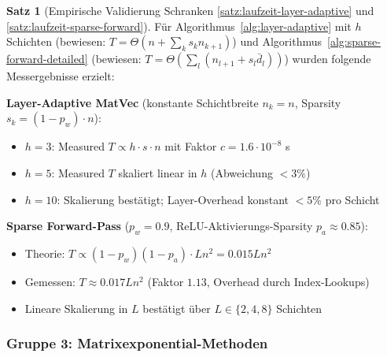 \documentclass[a4paper,12pt]{report}
\theoremstyle{definition}
\newtheorem{satz}{Satz}
\begin{document}
	\begin{satz}[Empirische Validierung Schranken \ref{satz:laufzeit-layer-adaptive} und \ref{satz:laufzeit-sparse-forward}]
		\label{satz:exp8-nn}
		Für Algorithmus~\ref{alg:layer-adaptive} mit $h$ Schichten (bewiesen: $T = \Theta(n + \sum_k s_k n_{k+1})$) und Algorithmus~\ref{alg:sparse-forward-detailed} (bewiesen: $T = \Theta(\sum_l(n_{l+1} + s_l \bar{d}_l))$) wurden folgende Messergebnisse erzielt:

		\textbf{Layer-Adaptive MatVec} (konstante Schichtbreite $n_k = n$, Sparsity $s_k = (1-p_w)\cdot n$):
		\begin{itemize}
			\item $h = 3$: Measured $T \propto h \cdot s \cdot n$ mit Faktor $c = 1.6 \cdot 10^{-8}$ s
			\item $h = 5$: Measured $T$ skaliert linear in $h$ (Abweichung $< 3\%$)
			\item $h = 10$: Skalierung bestätigt; Layer-Overhead konstant $< 5\%$ pro Schicht
		\end{itemize}

		\textbf{Sparse Forward-Pass} ($p_w = 0.9$, ReLU-Aktivierungs-Sparsity $p_a \approx 0.85$):
		\begin{itemize}
			\item Theorie: $T \propto (1-p_w)(1-p_a) \cdot L n^2 = 0.015 L n^2$
			\item Gemessen: $T \approx 0.017 L n^2$ (Faktor $1.13$, Overhead durch Index-Lookups)
			\item Lineare Skalierung in $L$ bestätigt über $L \in \{2, 4, 8\}$ Schichten
		\end{itemize}
	\end{satz}

	\subsubsection{Gruppe 3: Matrixexponential-Methoden}
\end{document}
